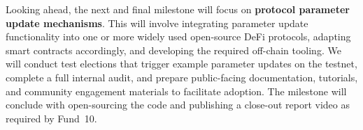 \documentclass{article}
\begin{document}
\medskip

Looking ahead, the next and final milestone will focus on \textbf{protocol parameter update mechanisms}.  
This will involve integrating parameter update functionality into one or more widely used open-source DeFi protocols, adapting smart contracts accordingly, and developing the required off-chain tooling.  
We will conduct test elections that trigger example parameter updates on the testnet, complete a full internal audit, and prepare public-facing documentation, tutorials, and community engagement materials to facilitate adoption.  
The milestone will conclude with open-sourcing the code and publishing a close-out report video as required by Fund~10.
\end{document}
